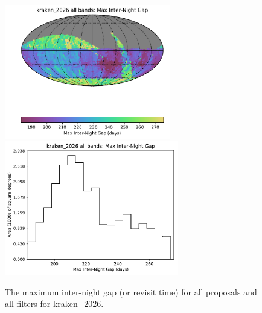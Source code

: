 \documentclass[DM,authoryear,toc]{lsstdoc}
\begin{document}
\begin{figure}[htb]
\centering
\vskip -0.0in
\includegraphics[height=2.3in]{figures/kraken_2026_Max_Inter-Night_Gap_all_bands_HEAL_SkyMap.pdf}
\includegraphics[height=2.3in]{figures/kraken_2026_Max_Inter-Night_Gap_all_bands_HEAL_Histogram.pdf}
\vskip -0.1in
\caption{The maximum inter-night gap (or revisit time) for all proposals and all filters for kraken\_2026.}
\label{fig:baseline_MAXGapAll}
\end{figure}



%
\end{document}
